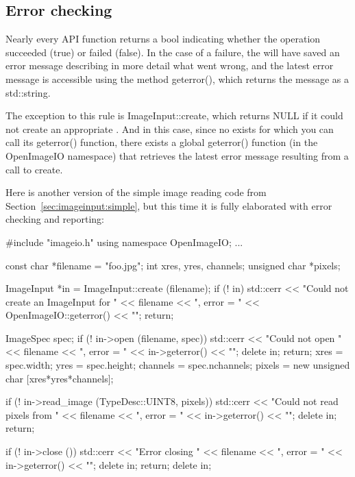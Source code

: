 \subsection{Error checking}
\label{sec:imageinput:errors}

Nearly every \ImageInput API function returns a {\cf bool} indicating
whether the operation succeeded ({\cf true}) or failed ({\cf false}).
In the case of a failure, the \ImageInput will have saved an error
message describing in more detail what went wrong, and the latest
error message is accessible using the \ImageInput method 
{\cf geterror()}, which returns the message as a {\cf std::string}.

The exception to this rule is {\cf ImageInput::create}, which returns
{\cf NULL} if it could not create an appropriate \ImageInput.  And in
this case, since no \ImageInput exists for which you can call its {\cf
  geterror()} function, there exists a global {\cf geterror()}
function (in the {\cf OpenImageIO} namespace) that retrieves the latest
error message resulting from a call to {\cf create}.

Here is another version of the simple image reading code from
Section~\ref{sec:imageinput:simple}, but this time it is fully
elaborated with error checking and reporting:

\begin{code}
        #include "imageio.h"
        using namespace OpenImageIO;
        ...

        const char *filename = "foo.jpg";
        int xres, yres, channels;
        unsigned char *pixels;

        ImageInput *in = ImageInput::create (filename);
        if (! in) {
            std::cerr << "Could not create an ImageInput for " 
                      << filename << ", error = " 
                      << OpenImageIO::geterror() << "\n";
            return;
        }

        ImageSpec spec;
        if (! in->open (filename, spec)) {
            std::cerr << "Could not open " << filename 
                      << ", error = " << in->geterror() << "\n";
            delete in;
            return;
        }
        xres = spec.width;
        yres = spec.height;
        channels = spec.nchannels;
        pixels = new unsigned char [xres*yres*channels];

        if (! in->read_image (TypeDesc::UINT8, pixels)) {
            std::cerr << "Could not read pixels from " << filename 
                      << ", error = " << in->geterror() << "\n";
            delete in;
            return;
        }

        if (! in->close ()) {
            std::cerr << "Error closing " << filename 
                      << ", error = " << in->geterror() << "\n";
            delete in;
            return;
        }
        delete in;
\end{code}



